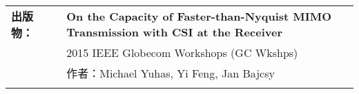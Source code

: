 \documentclass{minimal}
\begin{document}
\begin{CJK*}{UTF8}{gbsn}
\begin{tabular}{ p{1.5cm} p{1cm} p{16cm} }
\textbf{出版物：} & & \textbf{On the Capacity of Faster-than-Nyquist MIMO Transmission with CSI at the Receiver}\\
& & 2015 IEEE Globecom Workshops (GC Wkshps)\\
& & 作者：Michael Yuhas, Yi Feng, Jan Bajcsy\\
& & \\
\end{tabular}

\clearpage\end{CJK*}
\end{document}
